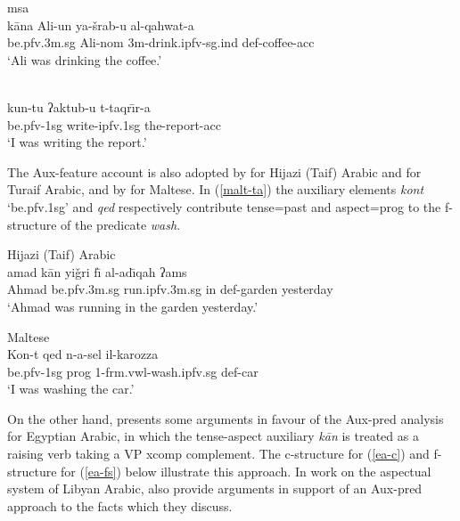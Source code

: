 \documentclass[output=paper,hidelinks]{langscibook}
\begin{document}
\ea   \label{kana}  {\sc msa} \citep[52]{Alsharif:PhD} \\
\gll k\={a}na Ali-un ya-šrab-u al-qahwat-a\\
be.{\sc pfv.3m.sg} Ali-{\sc nom} {\sc 3m}-drink.{\sc ipfv-sg.ind} {\sc def}-coffee-{\sc acc}\\
\glt `Ali was drinking the coffee.'
\z

\newpage

 \citep[18]{AlsharifSadler:09}\\
\gll
 kun-tu {ʔ}aktub-u t-taqr\={\i}r-a\\
be.{\sc pfv}-{\sc 1sg} write-{\sc ipfv}.{\sc 1sg} the-report-{\sc acc}\\
\glt `I was writing the report.'
\z







The Aux-feature account is also adopted by \citet{Alotaibi14Conditional}  for Hijazi (Taif) Arabic  and \citet{Alruwaili:PhD} for Turaif Arabic, and by \citet{Camilleri:PhD16} for Maltese. In (\ref{malt-ta}) the auxiliary elements {\em kont} `be.{\sc pfv.1sg}' and {\em qed}  respectively contribute {\sc tense}={\sc past} and {\sc aspect}={\sc prog} to the f-structure of the predicate {\em wash}.


\ea Hijazi (Taif) Arabic \citep[37]{Alotaibi14Conditional}\\
a{\hwithstroke}mad k\={a}n yi\v{g}ri f\={\i} al-{\hwithstroke}ad\={\i}qah {ʔ}ams\\
Ahmad be.{\sc pfv.3m.sg} run.{\sc ipfv.3m.sg} in {\sc def}-garden yesterday\\
\glt `Ahmad was running in the garden yesterday.'
\z


\ea \label{malt-ta}  Maltese  \citep[19]{Camilleri:PhD16}\\
\gll Kon-t qed n-a-{\hwithstroke}sel il-karozza\\
be.{\sc pfv-1sg} {\sc prog} 1-{\sc frm.vwl}-wash.{\sc ipfv.sg} {\sc def}-car\\
\glt `I was washing the car.'
\z




On the other hand, \citet{ElSadek:PhD} presents some arguments in  favour of the  Aux-{\sc pred} analysis for Egyptian Arabic, in which the tense-aspect auxiliary {\em k\={a}n} is treated as a raising verb taking a VP {\sc xcomp} complement. The c-structure for (\ref{ea-c}) and f-structure for (\ref{ea-fs}) below illustrate this approach.  In work on the aspectual system of Libyan Arabic, \citet{BoerjarsGhadgoudPayne16} also provide arguments in support of an Aux-{\sc pred} approach to the facts which they discuss.
\end{document}

